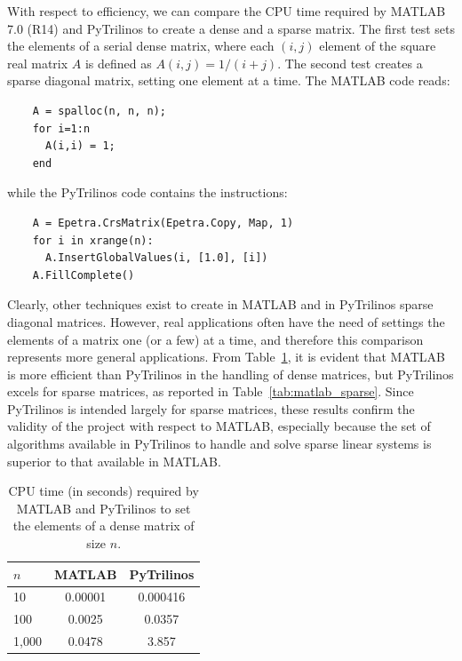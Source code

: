 \documentclass[acmtocl]{acmtrans2m}
\begin{document}
With respect to efficiency, we can compare the CPU time required by
MATLAB 7.0 (R14) and PyTrilinos to create a dense and a sparse matrix.
The first test sets the elements of a serial dense matrix, where each
$(i,j)$ element of the square real matrix $A$ is defined as $A(i,j) =
1/(i + j)$. The second test creates a sparse diagonal matrix, setting
one element at a time. The MATLAB code reads:
\begin{verbatim}
    A = spalloc(n, n, n);
    for i=1:n
      A(i,i) = 1;
    end
\end{verbatim}
while the PyTrilinos code contains the instructions:
\begin{verbatim}
    A = Epetra.CrsMatrix(Epetra.Copy, Map, 1)
    for i in xrange(n):
      A.InsertGlobalValues(i, [1.0], [i])
    A.FillComplete()
\end{verbatim}
Clearly, other techniques exist to create in MATLAB and in PyTrilinos
sparse diagonal matrices. However, real applications often have the
need of settings the elements of a matrix one (or a few) at a time,
and therefore this comparison represents more general applications.
From Table~\ref{tab:matlab_dense}, it is evident that MATLAB is more
efficient than PyTrilinos in the handling of dense matrices, but
PyTrilinos excels for sparse matrices, as reported in
Table~\ref{tab:matlab_sparse}. Since PyTrilinos is intended largely
for sparse matrices, these results confirm the validity of the project
with respect to MATLAB, especially because the set of algorithms
available in PyTrilinos to handle and solve sparse linear systems is
superior to that available in MATLAB.

\begin{table}
  \begin{center}
    \begin{tabular}{| l | c | c |}
      \hline
      $n$ & MATLAB & PyTrilinos \\
      \hline
      \hline
      10     & 0.00001 & 0.000416 \\
      100    & 0.0025 & 0.0357    \\
      1,000  & 0.0478 & 3.857     \\
      \hline
    \end{tabular}
    \caption{CPU time (in seconds) required by MATLAB and PyTrilinos
      to set the elements of a dense matrix of size $n$.}
    \label{tab:matlab_dense}
  \end{center}
\end{table}
\end{document}
